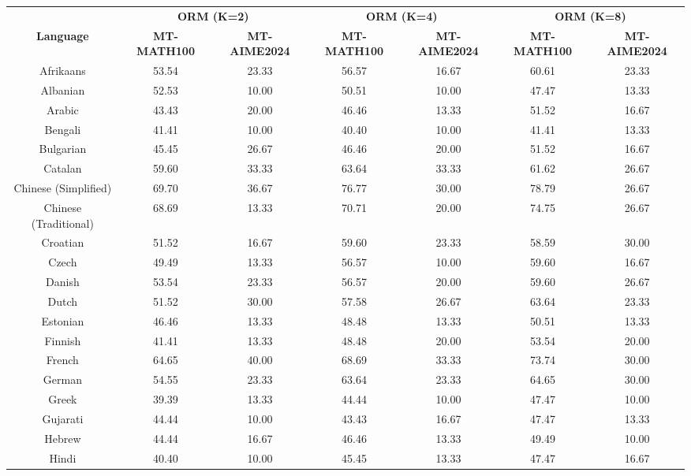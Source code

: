 \begin{table*}[]
\centering
\fontsize{7}{10} \selectfont
\begin{tabular}{c|cc|cc|cc}
\toprule
\multicolumn{1}{c|}{} & \multicolumn{2}{c|}{\textbf{ORM (K=2)}} & \multicolumn{2}{c|}{\textbf{ORM (K=4)}} & \multicolumn{2}{c}{\textbf{ORM (K=8)}} \\ \cmidrule{2-7}
\multicolumn{1}{c|}{\multirow{-2}{*}{\textbf{Language}}} & \textbf{MT-MATH100} & \multicolumn{1}{c|}{\textbf{MT-AIME2024}} & \textbf{MT-MATH100} & \multicolumn{1}{c|}{\textbf{MT-AIME2024}} & \textbf{MT-MATH100} & \textbf{MT-AIME2024} \\ \midrule
Afrikaans & 53.54 & 23.33 & 56.57 & 16.67 & 60.61 & 23.33 \\
Albanian & 52.53 & 10.00 & 50.51 & 10.00 & 47.47 & 13.33 \\
Arabic & 43.43 & 20.00 & 46.46 & 13.33 & 51.52 & 16.67 \\
Bengali & 41.41 & 10.00 & 40.40 & 10.00 & 41.41 & 13.33 \\
Bulgarian & 45.45 & 26.67 & 46.46 & 20.00 & 51.52 & 16.67 \\
Catalan & 59.60 & 33.33 & 63.64 & 33.33 & 61.62 & 26.67 \\
Chinese (Simplified) & 69.70 & 36.67 & 76.77 & 30.00 & 78.79 & 26.67 \\
Chinese (Traditional) & 68.69 & 13.33 & 70.71 & 20.00 & 74.75 & 26.67 \\
Croatian & 51.52 & 16.67 & 59.60 & 23.33 & 58.59 & 30.00 \\
Czech & 49.49 & 13.33 & 56.57 & 10.00 & 59.60 & 16.67 \\
Danish & 53.54 & 23.33 & 56.57 & 20.00 & 59.60 & 26.67 \\
Dutch & 51.52 & 30.00 & 57.58 & 26.67 & 63.64 & 23.33 \\
Estonian & 46.46 & 13.33 & 48.48 & 13.33 & 50.51 & 13.33 \\
Finnish & 41.41 & 13.33 & 48.48 & 20.00 & 53.54 & 20.00 \\
French & 64.65 & 40.00 & 68.69 & 33.33 & 73.74 & 30.00 \\
German & 54.55 & 23.33 & 63.64 & 23.33 & 64.65 & 30.00 \\
Greek & 39.39 & 13.33 & 44.44 & 10.00 & 47.47 & 10.00 \\
Gujarati & 44.44 & 10.00 & 43.43 & 16.67 & 47.47 & 13.33 \\
Hebrew & 44.44 & 16.67 & 46.46 & 13.33 & 49.49 & 10.00 \\
Hindi & 40.40 & 10.00 & 45.45 & 13.33 & 47.47 & 16.67 \\

\end{tabular}
\end{table*}
